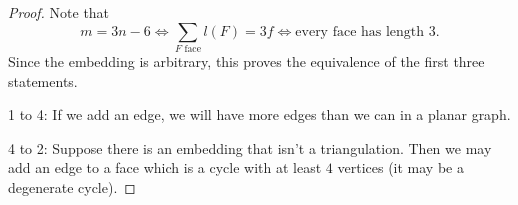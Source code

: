 \begin{proof}
  Note that
  \[
	m = 3n - 6 \iff \sum_{\text{$F$ face}} l(F) = 3f
	\iff \text{every face has length $3$}.
  \]
  Since the embedding is arbitrary, this proves the equivalence of the first
  three statements.

  1 to 4:
  If we add an edge, we will have more edges than we can in a planar graph.

  4 to 2:
  Suppose there is an embedding that isn't a triangulation.
  Then we may add an edge to a face which is a cycle with at least $4$ vertices
  (it may be a degenerate cycle).
\end{proof}

